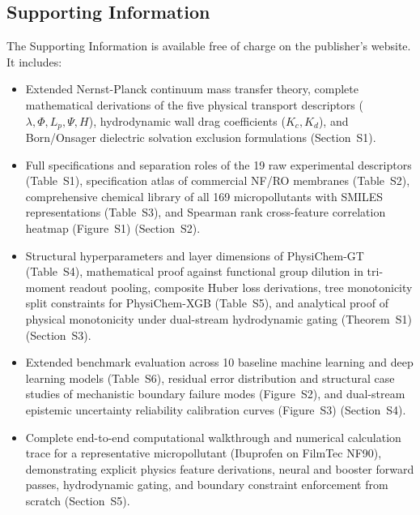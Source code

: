 \documentclass[11pt]{article}
\begin{document}
\subsection*{Supporting Information}
The Supporting Information is available free of charge on the publisher's website. It includes:
\begin{itemize}[leftmargin=1.2em, itemsep=1pt]
    \item Extended Nernst-Planck continuum mass transfer theory, complete mathematical derivations of the five physical transport descriptors ($\lambda, \Phi, L_p, \Psi, H$), hydrodynamic wall drag coefficients ($K_c, K_d$), and Born/Onsager dielectric solvation exclusion formulations (Section~S1).
    \item Full specifications and separation roles of the 19 raw experimental descriptors (Table~S1), specification atlas of commercial NF/RO membranes (Table~S2), comprehensive chemical library of all 169 micropollutants with SMILES representations (Table~S3), and Spearman rank cross-feature correlation heatmap (Figure~S1) (Section~S2).
    \item Structural hyperparameters and layer dimensions of PhysiChem-GT (Table~S4), mathematical proof against functional group dilution in tri-moment readout pooling, composite Huber loss derivations, tree monotonicity split constraints for PhysiChem-XGB (Table~S5), and analytical proof of physical monotonicity under dual-stream hydrodynamic gating (Theorem~S1) (Section~S3).
    \item Extended benchmark evaluation across 10 baseline machine learning and deep learning models (Table~S6), residual error distribution and structural case studies of mechanistic boundary failure modes (Figure~S2), and dual-stream epistemic uncertainty reliability calibration curves (Figure~S3) (Section~S4).
    \item Complete end-to-end computational walkthrough and numerical calculation trace for a representative micropollutant (Ibuprofen on FilmTec NF90), demonstrating explicit physics feature derivations, neural and booster forward passes, hydrodynamic gating, and boundary constraint enforcement from scratch (Section~S5).
\end{itemize}
\end{document}

